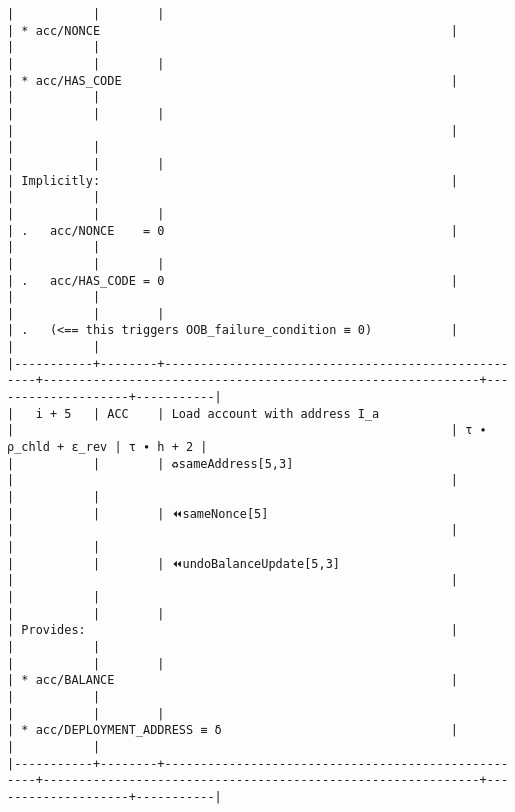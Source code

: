 \documentclass[varwidth=\maxdimen,margin=0.5cm,multi={verbatim}]{standalone}
\begin{document}
\begin{verbatim}
|           |        |                                                    | * acc/NONCE                                                 |                    |           |
|           |        |                                                    | * acc/HAS_CODE                                              |                    |           |
|           |        |                                                    |                                                             |                    |           |
|           |        |                                                    | Implicitly:                                                 |                    |           |
|           |        |                                                    | .   acc/NONCE    = 0                                        |                    |           |
|           |        |                                                    | .   acc/HAS_CODE = 0                                        |                    |           |
|           |        |                                                    | .   (<== this triggers OOB_failure_condition ≡ 0)           |                    |           |
|-----------+--------+----------------------------------------------------+-------------------------------------------------------------+--------------------+-----------|
|   i + 5   | ACC    | Load account with address I_a                      |                                                             | τ ∙ ρ_chld + ε_rev | τ ∙ h + 2 |
|           |        | ♻️sameAddress[5,3]                                  |                                                             |                    |           |
|           |        | ⏪sameNonce[5]                                     |                                                             |                    |           |
|           |        | ⏪undoBalanceUpdate[5,3]                           |                                                             |                    |           |
|           |        |                                                    | Provides:                                                   |                    |           |
|           |        |                                                    | * acc/BALANCE                                               |                    |           |
|           |        |                                                    | * acc/DEPLOYMENT_ADDRESS ≡ δ                                |                    |           |
|-----------+--------+----------------------------------------------------+-------------------------------------------------------------+--------------------+-----------|

\end{verbatim}
\end{document}
